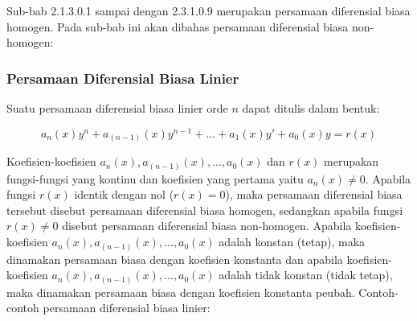Sub-bab 2.1.3.0.1 sampai dengan 2.3.1.0.9 merupakan persamaan diferensial biasa homogen. Pada sub-bab ini akan dibahas persamaan diferensial biasa non-homogen:

\subsubsection{Persamaan Diferensial Biasa Linier}
\label{sec:PDBLNR}

Suatu persamaan diferensial biasa linier orde \begin{math} n \end{math} dapat ditulis dalam bentuk:

\begin{equation} a_n(x)y^{n} + a_(n-1)(x)y^{n - 1} + ... + a_1(x)y' + a_0(x)y = r(x) \end{equation}

Koefisien-koefisien \begin{math} a_n(x), a_(n-1)(x), ..., a_0(x) \end{math} dan \begin{math} r(x) \end{math} merupakan fungsi-fungsi yang kontinu dan koefisien yang pertama yaitu \begin{math} a_n(x) \neq 0 \end{math}. Apabila fungsi \begin{math} r(x) \end{math} identik
dengan nol (\begin{math} r(x) = 0 \end{math}), maka persamaan diferensial biasa tersebut disebut persamaan diferensial biasa homogen, sedangkan apabila fungsi \begin{math} r(x) \neq 0 \end{math} disebut persamaan diferensial biasa non-homogen. Apabila koefisien-koefisien \begin{math} a_n(x), a_(n - 1)(x), ... , a_0(x) \end{math} adalah konstan (tetap), maka dinamakan persamaan biasa dengan koefisien konstanta dan apabila koefisien-koefisien \begin{math} a_n(x), a_(n - 1)(x), ... , a_0(x) \end{math} adalah tidak konstan (tidak tetap), maka dinamakan persamaan biasa dengan koefisien konstanta peubah. Contoh-contoh persamaan diferensial biasa linier:

